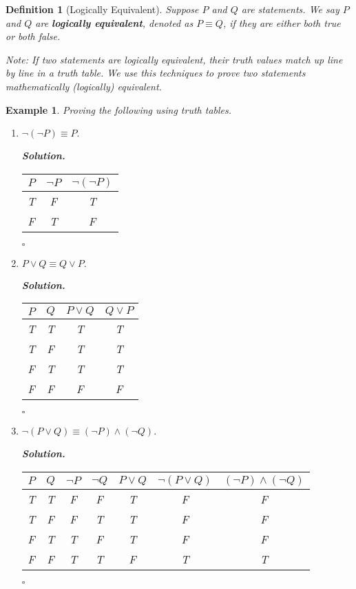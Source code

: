 \documentclass[12pt,a4paper]{article}
\newtheorem{df}{Definition}[subsection]
\newtheorem{eg}{Example}[subsection]
\newenvironment*{sol}{\par\indent\textbf{\textit{Solution. }}}{\hfill{$\square$}\par}
\begin{document}
\begin{df}[Logically Equivalent]
	Suppose $P$ and $Q$ are statements. We say $P$ and $Q$ are \textbf{logically equivalent}, denoted as $P\equiv Q$, if they are either both true or both false.
	
	Note: If two statements are logically equivalent, their truth values match up line by line in a truth table. We use this techniques to prove two statements mathematically (logically) equivalent. 
\end{df}
\begin{eg}
	Proving the following using truth tables.
	\begin{enumerate}
		\item $\neg(\neg P)\equiv P.$
		\begin{sol}\begin{center}\begin{tabular}{c|c|c}
		$P$&$\neg P$&$\neg(\neg P)$\\
		\hline
		T&F&T\\
		F&T&F
		\end{tabular}\end{center}\end{sol}
		\item $P\vee Q\equiv Q\vee P.$
		\begin{sol}\begin{center}\begin{tabular}{c|c|c|c}
			$P$&$Q$&$P\vee Q$&$Q\vee P$\\
			\hline
			T&T&T&T\\
			T&F&T&T\\
			F&T&T&T\\
			F&F&F&F
		\end{tabular}\end{center}\end{sol}
		\item $\neg(P\vee Q)\equiv(\neg P)\wedge(\neg Q).$
		\begin{sol}\begin{center}\begin{tabular}{c|c|c|c|c|c|c}
			$P$&$Q$&$\neg P$&$\neg Q$&$P\vee Q$&$\neg(P\vee Q)$&$(\neg P)\wedge(\neg Q)$\\
			\hline
			T&T&F&F&T&F&F\\
			T&F&F&T&T&F&F\\
			F&T&T&F&T&F&F\\
			F&F&T&T&F&T&T
		\end{tabular}\end{center}\end{sol}

\end{enumerate}
\end{eg}
\end{document}
